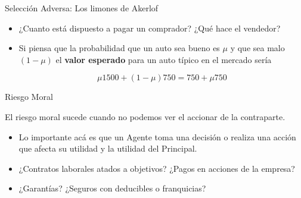 \documentclass{beamer}
\begin{document}
\begin{frame}{Selección Adversa: Los limones de Akerlof}
    \begin{itemize}
        \small
        \item ¿Cuanto está dispuesto a pagar un comprador? ¿Qué hace el vendedor?
        \item Si piensa que la probabilidad que un auto sea bueno es $\mu$ y que sea malo  $(1-\mu)$ el \textbf{valor esperado} para un auto típico en el mercado sería  
        
        \[\mu 1500 + (1-\mu) 750= 750 + \mu 750\] 
    \end{itemize}

    \centering
\end{frame}

\begin{frame}{Riesgo Moral}
    \begin{boxA}
        \centering
        El riesgo moral sucede cuando no podemos ver el accionar de la contraparte.
    \end{boxA}
    \begin{itemize}
        \item Lo importante acá es que un Agente toma una decisión o realiza una acción que afecta su
        utilidad y la utilidad del Principal.
        \item ¿Contratos laborales atados a objetivos? ¿Pagos en acciones de la empresa?
        \item ¿Garantías? ¿Seguros con deducibles o franquicias?
    \end{itemize}
    \centering
\end{frame}
\end{document}
